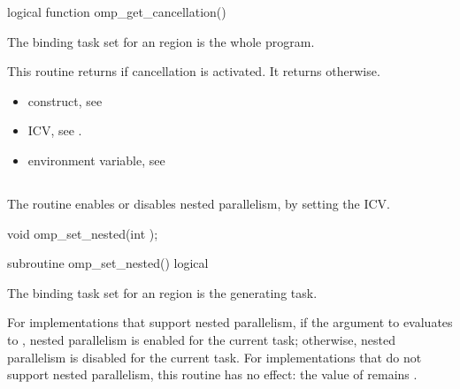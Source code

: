 \fortranspecificstart
\begin{boxedcode}
logical function omp\_get\_cancellation()
\end{boxedcode}
\fortranspecificend

\binding
The binding task set for an  region is the whole program.

\effect
This routine returns  if cancellation is activated. It returns  otherwise.

\crossreferences
\begin{itemize}
\item {} construct, see 

\item {} ICV, see 
.

\item {} environment variable, see 
\end{itemize}










\subsection{}
\label{subsec:omp_set_nested}
\summary
The  routine enables or disables nested parallelism, by setting the 
 ICV. 

\format
\ccppspecificstart
\begin{boxedcode}
void omp\_set\_nested(int );
\end{boxedcode}
\ccppspecificend

\fortranspecificstart
\begin{boxedcode}
subroutine omp\_set\_nested()
logical 
\end{boxedcode}
\fortranspecificend

\binding
The binding task set for an  region is the generating task. 

\effect
For implementations that support nested parallelism, if the argument to 
 evaluates to , nested parallelism is enabled for the current task; 
otherwise, nested parallelism is disabled for the current task. For implementations that 
do not support nested parallelism, this routine has no effect: the value of  
remains .


